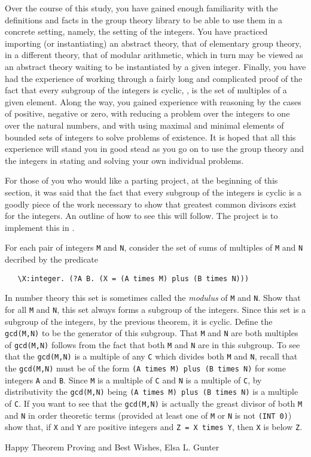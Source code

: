 Over the course of this study, you have gained enough familiarity with
the definitions and facts in the group theory library to be able to
use them in a concrete setting, namely, the setting of the integers.
You have practiced importing (or instantiating) an abstract theory,
that of elementary group theory, in a different theory, that of
modular arithmetic, which in turn may be viewed as an abstract theory
waiting to be instantiated by a given integer.  Finally, you have had
the experience of working through a fairly long and complicated proof
of the fact that every subgroup of the integers is cyclic, \ie, is the
set of multiples of a given element.  Along the way, you gained
experience with reasoning by the cases of positive, negative or zero,
with reducing a problem over the integers to one over the natural
numbers, and with using maximal and minimal elements of bounded sets
of integers to solve problems of existence.  It is hoped that all this
experience will stand you in good stead as you go on to use the group
theory and the integers in stating and solving your own individual
problems.

For those of you who would like a parting project, at the beginning of
this section, it was said that the fact that every subgroup of the
integers is cyclic is a goodly piece of the work necessary to show
that greatest common divisors exist for the integers.  An outline of
how to see this will follow.  The project is to implement this in \HOL.

For each pair of integers {\small\tt M} and {\small\tt N}, consider
the set of sums of multiples of {\small\tt M} and {\small\tt N}
decribed by the predicate 
\begin{verbatim}
   \X:integer. (?A B. (X = (A times M) plus (B times N)))
\end{verbatim}
In number theory this set is sometimes called the {\it modulus} of
{\small\tt M} and {\small\tt N}.  Show that for all {\small\tt M} and
{\small\tt N}, this set always forms a subgroup of the integers.
Since this set is a subgroup of the integers, by the previous theorem,
it is cyclic.  Define the {\small\verb+gcd(M,N)+} to be the generator
of this subgroup.  That {\small\tt M} and {\small\tt N} are both
multiples of {\small\verb+gcd(M,N)+} follows from the fact that both
{\small\tt M} and {\small\tt N} are in this subgroup.  To see that the
{\small\verb+gcd(M,N)+} is a multiple of any {\small\tt C} which
divides both {\small\tt M} and {\small\tt N}, recall that the
{\small\verb+gcd(M,N)+} must be of the form
{\small\verb+(A times M) plus (B times N)+} for some integers
{\small\tt A} and {\small\tt B}.  Since {\small\tt M} is a multiple of
{\small\tt C} and {\small\tt N} is a multiple of {\small\tt C}, by
distributivity the {\small\verb+gcd(M,N)+} being
{\small\verb+(A times M) plus (B times N)+} is a multiple of
{\small\tt C}.  If you want to see that the {\small\verb+gcd(M,N)+} is
actually the greast divisor of both {\small\tt M} and {\small\tt N} in
order theoretic terms (provided at least one of {\small\tt M} or
{\small\tt N} is not {\small\verb+(INT 0)+}) show that, if {\small\tt X}
and {\small\tt Y} are positive integers and {\small\verb+Z = X times Y+},
then {\small\tt X} is below {\small\tt Z}. 

Happy Theorem Proving and Best Wishes, Elsa L. Gunter

